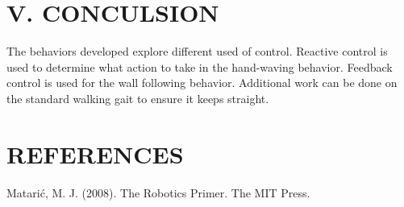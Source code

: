 \documentclass[11pt]{article}
\begin{document}
\section*{V. CONCULSION}
The behaviors developed explore different used of control. Reactive control is used to determine what action to take in the hand-waving behavior. Feedback control is used for the wall following behavior. Additional work can be done on the standard walking gait to ensure it keeps straight.

\section*{REFERENCES}

Matarić, M. J. (2008). The Robotics Primer. The MIT Press. 
\end{document}

